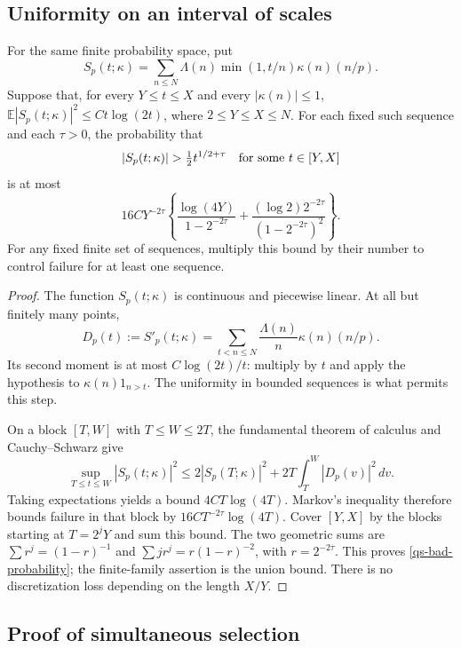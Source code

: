 \subsection{Uniformity on an interval of scales}

\begin{lemma}\label{qs-maximal}
For the same finite probability space, put
\[
 S_p(t;\kappa)=\sum_{n\le N}\Lambda(n)\min(1,t/n)
                                      \kappa(n)(n/p).
\]
Suppose that, for every $Y\le t\le X$ and every
$|\kappa(n)|\le1$,
$\mathbb E|S_p(t;\kappa)|^2\le C t\log(2t)$, where
$2\le Y\le X\le N$. For each fixed such sequence and each
$\tau>0$, the probability that
\[
 |S_p(t;\kappa)|>\tfrac12t^{1/2+\tau}
       \quad\hbox{for some }t\in[Y,X]
\]
is at most
\begin{equation}\label{qs-bad-probability}
 16C Y^{-2\tau}
 \left\{\frac{\log(4Y)}{1-2^{-2\tau}}
       +\frac{(\log2)2^{-2\tau}}{(1-2^{-2\tau})^2}\right\}.
\end{equation}
For any fixed finite set of sequences, multiply this bound by
their number to control failure for at least one sequence.
\end{lemma}
\begin{proof}
The function $S_p(t;\kappa)$ is continuous and piecewise linear.
At all but finitely many points,
\[
 D_p(t):=S'_p(t;\kappa)
       =\sum_{t<n\le N}\frac{\Lambda(n)}n\kappa(n)(n/p).
\]
Its second moment is at most $C\log(2t)/t$: multiply by $t$
and apply the hypothesis to
$\kappa(n)1_{n>t}$. The uniformity in bounded sequences is what
permits this step.

On a block $[T,W]$ with $T\le W\le2T$, the fundamental theorem
of calculus and Cauchy--Schwarz give
\[
 \sup_{T\le t\le W}|S_p(t;\kappa)|^2
 \le2|S_p(T;\kappa)|^2+2T\int_T^W|D_p(v)|^2\,dv.
\]
Taking expectations yields a bound $4CT\log(4T)$.
Markov's inequality therefore bounds failure in that block by
$16CT^{-2\tau}\log(4T)$. Cover $[Y,X]$ by the blocks starting
at $T=2^jY$ and sum this bound. The two geometric sums are
$\sum r^j=(1-r)^{-1}$ and
$\sum jr^j=r(1-r)^{-2}$, with $r=2^{-2\tau}$.
This proves \eqref{qs-bad-probability}; the finite-family assertion
is the union bound. There is no discretization loss depending on
the length $X/Y$.
\end{proof}

\subsection{Proof of simultaneous selection}

